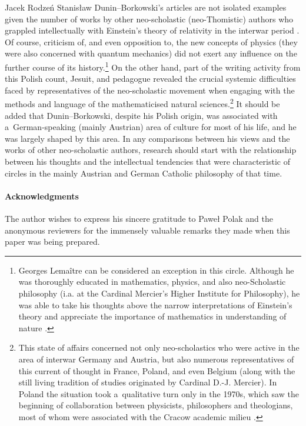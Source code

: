 \begin{artengenv}{Jacek Rodzeń}
Stanisław Dunin–Borkowski's articles are not isolated examples given the number of works by other neo-scholastic (neo-Thomistic) authors who grappled intellectually with Einstein's theory of relativity in the interwar period 
\parencites[cf.][]{polak_zmagania_2016}[and beyond the above-mentioned works][]{glick_relativity_1987}[][]{flipse_between_2010}[][]{hagen_local_2020}. %
 Of course, criticism of, and even opposition to, the new concepts of physics (they were also concerned with quantum mechanics) did not exert any influence on the further course of its history.\footnote{Georges Lemaître can be considered an exception in this circle. Although he was thoroughly educated in mathematics, physics, and also neo-Scholastic philosophy (i.a. at the Cardinal Mercier's Higher Institute for Philosophy), he was able to take his thoughts above the narrow interpretations of Einstein's theory and appreciate the importance of mathematics in understanding of nature 
\parencite[][pp.241–242]{hagen_local_2020}.%
} On the other hand, part of the writing activity from this Polish count, Jesuit, and pedagogue revealed the crucial systemic difficulties faced by representatives of the neo-scholastic movement when engaging with the methods and language of the mathematicised natural sciences.\footnote{This state of affairs concerned not only neo-scholastics who were active in the area of interwar Germany and Austria, but also numerous representatives of this current of thought in France, Poland, and even Belgium (along with the still living tradition of studies originated by Cardinal D.-J. Mercier). In Poland the situation took a~qualitative turn only in the 1970s, which saw the beginning of collaboration between physicists, philosophers and theologians, most of whom were associated with the Cracow academic milieu 
\parencites[cf.][]{wolak_filozofia_1991}[][]{polak_science-religion_2021}[][]{trombik_koncepcje_2021}. %
 } It should be added that Dunin–Borkowski, despite his Polish origin, was associated with a~German-speaking (mainly Austrian) area of culture for most of his life, and he was largely shaped by this area. In any comparisons between his views and the works of other neo-scholastic authors, research should start with the relationship between his thoughts and the intellectual tendencies that were characteristic of circles in the mainly Austrian and German Catholic philosophy of that time.

\paragraph{Acknowledgments}
The author wishes to express his sincere gratitude to Paweł Polak and the anonymous reviewers for the immensely valuable remarks they made when this paper was being prepared.

\end{artengenv}
